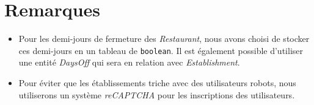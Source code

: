 \documentclass{article}
\begin{document}
\section*{Remarques}
    \begin{itemize}
        \item Pour les demi-jours de fermeture des \textsl{Restaurant}, nous avons choisi de stocker ces demi-jours en un tableau de \texttt{boolean}. Il est également possible d'utiliser une entité \textsl{DaysOff} qui sera en relation avec \textsl{Establishment}.
        \item Pour éviter que les établissements triche avec des utilisateurs robots, nous utiliserons un système \textsl{reCAPTCHA} pour les inscriptions des utilisateurs.
        
    \end{itemize}
\end{document}
